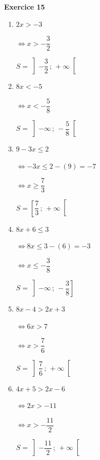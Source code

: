 \documentclass[12pt,a4paper,french]{article}
\begin{document}
\noindent\textbf{Exercice 15}\par
\smallskip
\begin{enumerate}
\item $2x > -3$

$\Leftrightarrow x > - \dfrac{3}{2}$

$S = \left] - \dfrac{3}{2} \,;\, +\infty \right[$
\item $8x < -5$

$\Leftrightarrow x < - \dfrac{5}{8}$

$S = \left] -\infty \,;\, - \dfrac{5}{8} \right[$
\item $9 - 3 x \leq 2$

$\Leftrightarrow -3x \leq 2 - (9) = -7$

$\Leftrightarrow x \geq \dfrac{7}{3}$

$S = \left[ \dfrac{7}{3} \,;\, +\infty \right[$
\item $8 x + 6 \leq 3$

$\Leftrightarrow 8x \leq 3 - (6) = -3$

$\Leftrightarrow x \leq - \dfrac{3}{8}$

$S = \left] -\infty \,;\, - \dfrac{3}{8} \right]$
\item $8 x - 4 > 2 x + 3$

$\Leftrightarrow 6x > 7$

$\Leftrightarrow x > \dfrac{7}{6}$

$S = \left] \dfrac{7}{6} \,;\, +\infty \right[$
\item $4 x + 5 > 2 x - 6$

$\Leftrightarrow 2x > -11$

$\Leftrightarrow x > - \dfrac{11}{2}$

$S = \left] - \dfrac{11}{2} \,;\, +\infty \right[$
\end{enumerate}
\medskip
\end{document}
